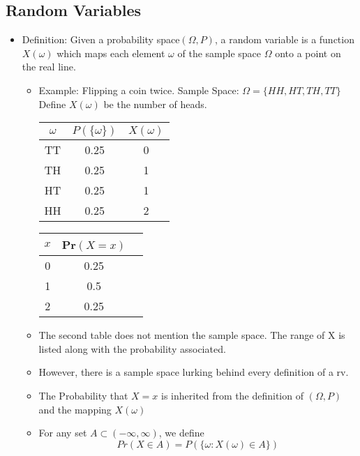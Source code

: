 \documentclass[12pt]{article}
\begin{document}
\subsection{Random Variables}
\begin{itemize}
\item Definition: Given a probability space$(\Omega, P)$, a random variable is a function $X(\omega)$ which maps each element $\omega$ of the sample space $\Omega$ onto a point on the real line.
\begin{itemize}
\item Example: Flipping a coin twice. Sample Space: $\Omega = \{HH,HT,TH,TT\}$ Define $X(\omega)$ be the number of heads.
\begin{table}[h]
\begin{subtable}[h]{.5\linewidth}
\centering
\begin{tabular}{ |c|c|c|} 
\hline
$\omega$ & $P(\{\omega\})$ & $X(\omega)$ \\
\hline
\hline
TT & 0.25 & 0 \\ 
TH & 0.25 & 1 \\ 
HT & 0.25 & 1 \\ 
HH & 0.25 & 2 \\ 
\hline
\end{tabular}
\end{subtable}
\hfill
\begin{subtable}[h]{0.5\linewidth}
\centering
\begin{tabular}{ |c|c|c| } 
\hline
$x$ & Pr$(X=x)$ \\
\hline
\hline
0 & 0.25\\ 
1 & 0.5 \\ 
2 & 0.25\\ 
 
\hline
\end{tabular}
\end{subtable}
\end{table}
\item The second table does not mention the sample space. The range of X is listed along with the probability associated. 
\item However, there is a sample space lurking behind every definition of a rv.
\item The Probability that $X=x$ is inherited from the definition of $(\Omega, P)$ and the mapping $X(\omega)$ 
\item For any set $A \subset (-\infty, \infty)$, we define
$$ Pr(X \in A) = P(\{\omega : X(\omega)  \in A\})$$


\end{itemize}
\end{itemize}
\end{document}

